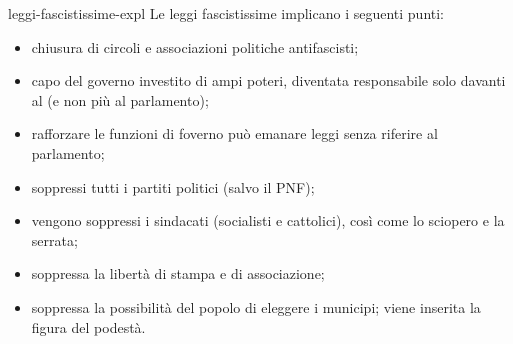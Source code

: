 \documentclass[preview]{standalone}
\begin{document}
\begin{snippet}{leggi-fascistissime-expl}
    Le leggi fascistissime implicano i seguenti punti:
    \begin{itemize}
        \item chiusura di circoli e associazioni politiche antifascisti;
        \item capo del governo investito di ampi poteri, diventata responsabile solo davanti al (e non più al parlamento);
        \item rafforzare le funzioni di foverno può emanare leggi senza riferire al parlamento;
        \item soppressi tutti i partiti politici (salvo il PNF);
        \item vengono soppressi i sindacati (socialisti e cattolici), così come lo sciopero e la serrata;
        \item soppressa la libertà di stampa e di associazione;
        \item soppressa la possibilità del popolo di eleggere i municipi; viene inserita la figura del podestà.
    \end{itemize}
\end{snippet}



\end{document}
